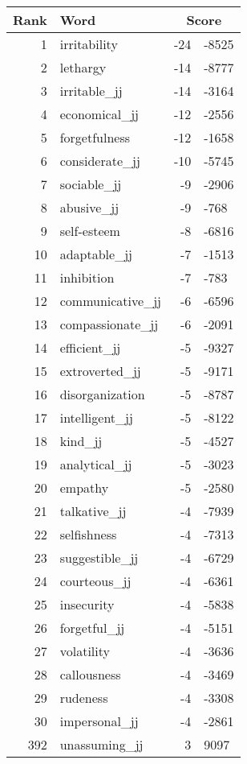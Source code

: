 \begin{longtable}[!htbp]{| rlr@{.}l |}
    \hline
    \textbf{Rank} & \textbf{Word} & \multicolumn{2}{c|}{\textbf{Score}} \\
    \hline
    \endhead
    1 & irritability & -24 & -8525 \\
    2 & lethargy & -14 & -8777 \\
    3 & irritable\_jj & -14 & -3164 \\
    4 & economical\_jj & -12 & -2556 \\
    5 & forgetfulness & -12 & -1658 \\
    6 & considerate\_jj & -10 & -5745 \\
    7 & sociable\_jj & -9 & -2906 \\
    8 & abusive\_jj & -9 & -768 \\
    9 & self-esteem & -8 & -6816 \\
    10 & adaptable\_jj & -7 & -1513 \\
    11 & inhibition & -7 & -783 \\
    12 & communicative\_jj & -6 & -6596 \\
    13 & compassionate\_jj & -6 & -2091 \\
    14 & efficient\_jj & -5 & -9327 \\
    15 & extroverted\_jj & -5 & -9171 \\
    16 & disorganization & -5 & -8787 \\
    17 & intelligent\_jj & -5 & -8122 \\
    18 & kind\_jj & -5 & -4527 \\
    19 & analytical\_jj & -5 & -3023 \\
    20 & empathy & -5 & -2580 \\
    21 & talkative\_jj & -4 & -7939 \\
    22 & selfishness & -4 & -7313 \\
    23 & suggestible\_jj & -4 & -6729 \\
    24 & courteous\_jj & -4 & -6361 \\
    25 & insecurity & -4 & -5838 \\
    26 & forgetful\_jj & -4 & -5151 \\
    27 & volatility & -4 & -3636 \\
    28 & callousness & -4 & -3469 \\
    29 & rudeness & -4 & -3308 \\
    30 & impersonal\_jj & -4 & -2861 \\
    392 & unassuming\_jj & 3 & 9097 \\

\end{longtable}
